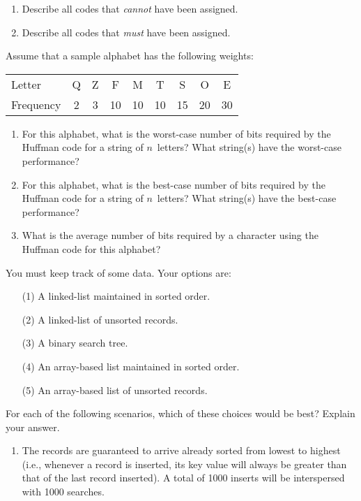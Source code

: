 \begin{exercises}
\begin{enumerate}
\item
Describe all codes that \emph{cannot} have been assigned.

\item
Describe all codes that \emph{must} have been assigned.
\end{enumerate}

\item
Assume that a sample alphabet has the following weights:

\smallskip
\begin{center}
\begin{tabular}{|l|cccccccc|}
\hline
\rule{0pt}{11pt}Letter      &Q & Z &  F &  M &  T &  S &  O &  E\\
\rule{0pt}{11pt}Frequency   &2 & 3 & 10 & 10 & 10 & 15 & 20 & 30\\
\hline
\end{tabular}
\end{center}

\smallskip
\begin{enumerate}
\item
For this alphabet, what is the worst-case number of bits required
by the Huffman code for a string of
\(n\)~letters?
What string(s) have the worst-case performance?

\item
For this alphabet, what is the best-case number of bits required by
the Huffman code for a string of \(n\)~letters?
What string(s) have the best-case performance?

\item
What is the average number of bits required by a character using
the Huffman code for this alphabet?
\end{enumerate}

\item
You must keep track of some data.
Your options are:
\begin{enumerate}
\itemsep=0pt
\item[(1)] A linked-list maintained in sorted order.
\item[(2)] A linked-list of unsorted records.
\item[(3)] A binary search tree.
\item[(4)] An array-based list maintained in sorted order.
\item[(5)] An array-based list of unsorted records.
\end{enumerate}

For each of the following scenarios, which of these choices would be
best?
Explain your answer.
\begin{enumerate}
\item
The records are guaranteed to arrive already sorted from
lowest to highest (i.e., whenever a record is inserted, its key value
will always be greater than that of the last record inserted).
A total of 1000 inserts will be interspersed with 1000 searches.


\end{enumerate}
\end{exercises}
